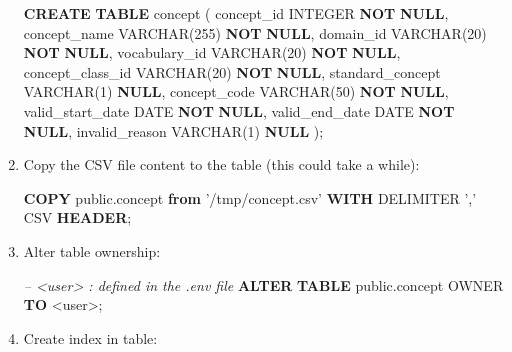 \documentclass[]{book}
\newenvironment{Shaded}{\begin{snugshade}}{\end{snugshade}}
\newcommand{\KeywordTok}[1]{\textcolor[rgb]{0.13,0.29,0.53}{\textbf{#1}}}
\newcommand{\DataTypeTok}[1]{\textcolor[rgb]{0.13,0.29,0.53}{#1}}
\newcommand{\DecValTok}[1]{\textcolor[rgb]{0.00,0.00,0.81}{#1}}
\newcommand{\StringTok}[1]{\textcolor[rgb]{0.31,0.60,0.02}{#1}}
\newcommand{\CommentTok}[1]{\textcolor[rgb]{0.56,0.35,0.01}{\textit{#1}}}
\newcommand{\NormalTok}[1]{#1}
\begin{document}
\begin{enumerate}
\begin{Shaded}
\begin{Highlighting}[]
    \KeywordTok{CREATE} \KeywordTok{TABLE}\NormalTok{ concept (}
\NormalTok{      concept_id         }\DataTypeTok{INTEGER}        \KeywordTok{NOT} \KeywordTok{NULL}\NormalTok{,}
\NormalTok{      concept_name       }\DataTypeTok{VARCHAR}\NormalTok{(}\DecValTok{255}\NormalTok{)   }\KeywordTok{NOT} \KeywordTok{NULL}\NormalTok{,}
\NormalTok{      domain_id          }\DataTypeTok{VARCHAR}\NormalTok{(}\DecValTok{20}\NormalTok{)    }\KeywordTok{NOT} \KeywordTok{NULL}\NormalTok{,}
\NormalTok{      vocabulary_id      }\DataTypeTok{VARCHAR}\NormalTok{(}\DecValTok{20}\NormalTok{)    }\KeywordTok{NOT} \KeywordTok{NULL}\NormalTok{,}
\NormalTok{      concept_class_id   }\DataTypeTok{VARCHAR}\NormalTok{(}\DecValTok{20}\NormalTok{)    }\KeywordTok{NOT} \KeywordTok{NULL}\NormalTok{,}
\NormalTok{      standard_concept   }\DataTypeTok{VARCHAR}\NormalTok{(}\DecValTok{1}\NormalTok{)     }\KeywordTok{NULL}\NormalTok{,}
\NormalTok{      concept_code       }\DataTypeTok{VARCHAR}\NormalTok{(}\DecValTok{50}\NormalTok{)    }\KeywordTok{NOT} \KeywordTok{NULL}\NormalTok{,}
\NormalTok{      valid_start_date   }\DataTypeTok{DATE}           \KeywordTok{NOT} \KeywordTok{NULL}\NormalTok{,}
\NormalTok{      valid_end_date     }\DataTypeTok{DATE}           \KeywordTok{NOT} \KeywordTok{NULL}\NormalTok{,}
\NormalTok{      invalid_reason     }\DataTypeTok{VARCHAR}\NormalTok{(}\DecValTok{1}\NormalTok{)     }\KeywordTok{NULL}
\NormalTok{    );}
\end{Highlighting}
\end{Shaded}
\item
  Copy the CSV file content to the table (this could take a while):

\begin{Shaded}
\begin{Highlighting}[]
\KeywordTok{COPY}\NormalTok{ public.concept }\KeywordTok{from} \StringTok{'/tmp/concept.csv'} \KeywordTok{WITH}\NormalTok{ DELIMITER }\StringTok{','}
\NormalTok{    CSV }\KeywordTok{HEADER}\NormalTok{;}
\end{Highlighting}
\end{Shaded}
\item
  Alter table ownership:

\begin{Shaded}
\begin{Highlighting}[]
\CommentTok{-- <user> : defined in the .env file}
\KeywordTok{ALTER} \KeywordTok{TABLE}\NormalTok{ public.concept OWNER }\KeywordTok{TO}\NormalTok{ <user>;}
\end{Highlighting}
\end{Shaded}
\item
  Create index in table:


\end{enumerate}
\end{document}
